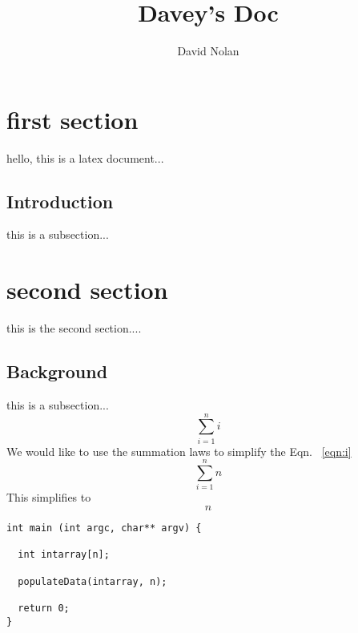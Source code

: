 \documentclass[12pt]{article}
\title{Davey's Doc}
\date{}
\author{David Nolan}
\begin{document}
\maketitle{}
\section{first section}
hello, this is a latex document...
\subsection{Introduction}
this is a subsection...
\section{second section}
this is the second section....
\subsection{Background}
this is a subsection...
\begin{equation} 
\label{eqn:i}
\sum_{i=1}^n i
\end{equation}
We would like to use the summation laws to simplify the Eqn. ~\ref{eqn:i}
\begin{equation} 
\label{eqn:j}
\sum_{i=1}^n n
\end{equation}
This simplifies to
\begin{equation}
n
\end{equation}

\begin{verbatim}
int main (int argc, char** argv) {

  int intarray[n];

  populateData(intarray, n);

  return 0;
}
\end{verbatim}

\end{document}
